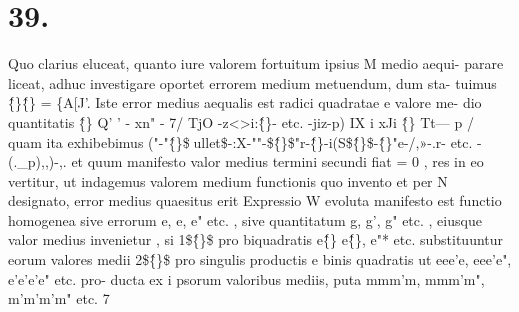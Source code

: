 \documentclass[12pt,a4paper]{article}
\begin{document}
\section*{\textbf{39.}}
Quo clarius eluceat, quanto iure valorem fortuitum ipsius M medio aequi-
parare liceat, adhuc investigare oportet errorem medium metuendum, dum sta-
tuimus \^\{\}\^\{\} = \{A[J'. Iste error medius aequalis est radici quadratae e valore me-
dio quantitatis
\^\{\} Q' ' - xn" - 7/ TjO -z<>i:\^\{\}- etc. -jiz-p) IX i xJi
\^\{\} Tt--- p /
quam ita exhibebimus
("-"\^\{\}\$ullet\$-:X-""-\$\^\{\}\circ\$"r-\^\{\}-i(S\$\^\{\}\circ\$-\^\{\}"e-/,»-.r-
etc. -(.\_p),,)-,.
et quum manifesto valor medius termini secundi fiat = 0 , res in eo vertitur, ut
indagemus valorem medium functionis
quo invento et per N designato, error medius quaesitus erit
Expressio W evoluta manifesto est functio homogenea sive errorum e, e, e"
etc. , sive quantitatum g, g', g" etc. , eiusque valor medius invenietur , si
1\$\^\{\}\circ\$ pro biquadratis e\^\{\} e\^\{\}, e"* etc. substituuntur eorum valores medii
2\$\^\{\}\circ\$ pro singulis productis e binis quadratis ut eee'e, eee'e", e'e'e'e" etc. pro-
ducta ex i psorum valoribus mediis, puta mmm'm, mmm'm", m'm'm'm" etc.
7
\end{document}
